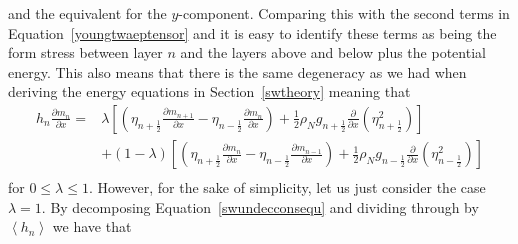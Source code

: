 \documentclass[12pt,a4paper]{report}
\newcommand*\nthkmean[1]{\left\langle{#1}\right\rangle}
\newcommand*\equref[1]{Equation~\eqref{#1}}
\newcommand*\secref[1]{Section~\ref{#1}}
\newcommand*{\half}{\frac{1}{2}}
\begin{document}
    and the equivalent for the $y$-component. Comparing this with the second 
    terms in \equref{youngtwaeptensor} and it is easy to identify these terms as being
    the form stress between layer $n$ and the layers above and below plus the potential
    energy. This also means that there is the same degeneracy as we had when 
    deriving the energy equations in \secref{swtheory} meaning that 
    \begin{equation}
    \begin{split}
    h_{n}\frac{\partial m_{n}}{\partial x}
    =&\lambda\left[\left(\eta_{n+\half}\frac{\partial m_{n+1}}{\partial x}
    -\eta_{n-\half}\frac{\partial m_{n}}{\partial x}\right)
    +\half\rho_{N}g_{n+\half}\frac{\partial }{\partial x}\left(\eta_{n+\half}^{2}\right)\right]\\
    &+\left(1-\lambda\right)\left[\left(\eta_{n+\half}\frac{\partial m_{n}}{\partial x}
    -\eta_{n-\half}\frac{\partial m_{n-1}}{\partial x}\right)
    +\half\rho_{N}g_{n-\half}\frac{\partial }{\partial x}\left(\eta_{n-\half}^{2}\right)\right]\\
    \end{split}
    \end{equation}
    for $0\leq\lambda\leq1$. However, for the sake of simplicity, let us just consider
    the case $\lambda = 1$. By decomposing \equref{swundecconsequ} and dividing 
    through by $\nthkmean{h_{n}}$ we have that 
\end{document}
